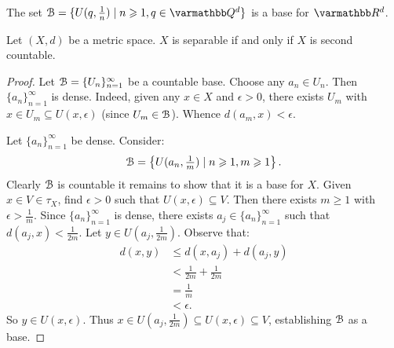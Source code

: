     \begin{example}
        The set $\cB = \{U(q,\frac{1}{n}) \mid n \geq 1,q \in \bfQ^d\}$ is a base for $\bfR^d$.
    \end{example}

    \begin{proposition}
        Let $(X,d)$ be a metric space. $X$ is separable if and only if $X$ is second countable.
    \end{proposition}
        \begin{proof}
            Let $\mathcal{B} = \{U_n\}_{n=1}^\infty$ be a countable base. Choose any $a_n \in U_n$. Then $\{a_n\}_{n = 1}^\infty$ is dense. Indeed, given any $x \in X$ and $\epsilon>0$, there exists $U_m$ with $x \in U_m \subseteq U(x,\epsilon)$ (since $U_m \in \mathcal{B}$). Whence $d(a_m,x) < \epsilon$.

            Let $\{a_n\}_{n = 1}^\infty$ be dense. Consider:
                \begin{equation*}
                \begin{split}
                    \mathcal{B} = \left\{U(a_n,{\textstyle \frac{1}{m}}) \mid n \geqslant 1, m \geqslant 1\right\}.
                \end{split}
                \end{equation*}
            Clearly $\mathcal{B}$ is countable \textemdash it remains to show that it is a base for $X$. Given $x \in V \in \tau_X$, find $\epsilon > 0$ such that $U(x,\epsilon) \subseteq V$. Then there exists $m \geq 1$ with $\epsilon > \frac{1}{m}$. Since $\{a_n\}_{n = 1}^\infty$ is dense, there exists $a_j \in \{a_n\}_{n = 1}^\infty$ such that $d(a_j,x) < \frac{1}{2m}$. Let $y \in U(a_j,\frac{1}{2m})$. Observe that:
                \begin{equation*}
                \begin{split}
                    d(x,y)
                    & \leq d(x,a_j) + d(a_j,y) \\
                    & < \frac{1}{2m} + \frac{1}{2m} \\
                    & = \frac{1}{m} \\
                    & < \epsilon.
                \end{split}
                \end{equation*}
            So $y \in U(x,\epsilon)$. Thus $x \in U(a_j,\frac{1}{2m}) \subseteq U(x,\epsilon) \subseteq V$, establishing $\mathcal{B}$ as a base.
        \end{proof}

